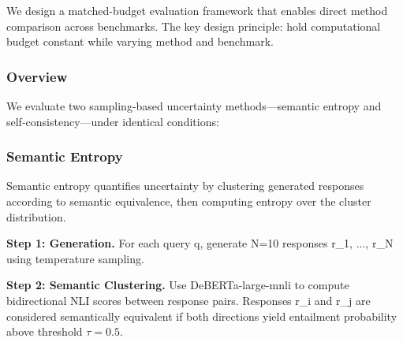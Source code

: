
We design a matched-budget evaluation framework that enables direct method comparison across benchmarks. The key design principle: hold computational budget constant while varying method and benchmark.

\subsubsection{Overview}

We evaluate two sampling-based uncertainty methods---semantic entropy and self-consistency---under identical conditions:

\begin{table}[htbp]
\centering
{}
\end{table}

\subsubsection{Semantic Entropy}

Semantic entropy quantifies uncertainty by clustering generated responses according to semantic equivalence, then computing entropy over the cluster distribution.

\textbf{Step 1: Generation.} For each query q, generate N=10 responses {r\_1, ..., r\_N} using temperature sampling.

\textbf{Step 2: Semantic Clustering.} Use DeBERTa-large-mnli to compute bidirectional NLI scores between response pairs. Responses r\_i and r\_j are considered semantically equivalent if both directions yield entailment probability above threshold $\tau =0.5$.

